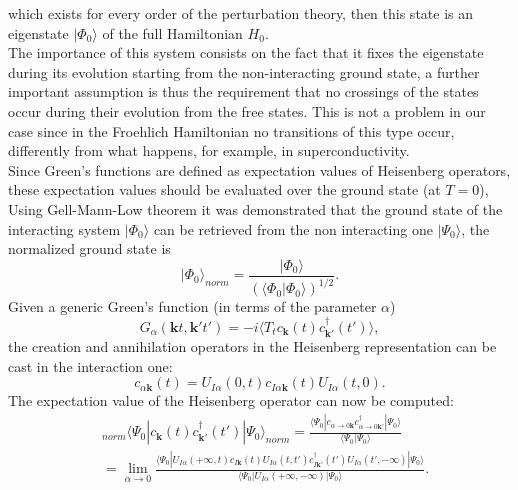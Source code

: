\documentclass[12pt, a4paper]{report}
\numberwithin{equation}{section}
\begin{document}
which exists for every order of the perturbation theory, then this state is an eigenstate $|\Phi_0\rangle$ of the full Hamiltonian $H_0$.\\
The importance of this system consists on the fact that it fixes the eigenstate during its evolution starting from the non-interacting ground 
state, a further important assumption is thus the requirement that no crossings of the states occur during their evolution from the free states. This is not 
a problem in our case since in the Froehlich Hamiltonian no transitions of this type occur, differently from what happens, for example, 
in superconductivity.\\
Since Green's functions are defined as expectation values of Heisenberg operators, these expectation values should be evaluated over the ground state (at $T=0$), 
Using Gell-Mann-Low theorem it was demonstrated that the ground state of the interacting system $|\Phi_0\rangle$ can be retrieved from the non interacting one $|\Psi_0\rangle$, 
the normalized ground state is
\begin{equation}
    |\Phi_0\rangle_{norm}=\frac{|\Phi_0\rangle}{\left(\langle \Phi_0|\Phi_0\rangle\right)^{1/2}}.
\end{equation}
Given a generic Green's function (in terms of the parameter $\alpha$)
\begin{equation}
    G_\alpha(\mathbf{k}t,\mathbf{k}'t')=-i\langle T_t c_{\mathbf{k}}(t)c^\dagger_{\mathbf{k}'}(t')\rangle,
\end{equation}
the creation and annihilation operators in the Heisenberg representation can be cast in the interaction one:
\begin{equation}
    c_{\alpha\mathbf{k}}(t)=U_{I\alpha}(0,t)c_{I\alpha\mathbf{k}}(t)U_{I\alpha}(t,0).
\end{equation}
The expectation value of the Heisenberg operator can now be computed:
\begin{equation}
\begin{split}
    &_{norm}\langle \Psi_0|c_{\mathbf{k}}(t)c^\dagger_{\mathbf{k}'}(t')|\Psi_0\rangle_{norm}=\frac{\langle\Psi_0|c_{\alpha\to0\mathbf{k}}c^\dagger_{\alpha\to0\mathbf{k}'}|\Psi_0\rangle}{\langle\Psi_0|\Psi_0\rangle}\\
    &=\lim_{\alpha\to0}\frac{\langle\Psi_0|U_{I\alpha}(+\infty,t)c_{I\mathbf{k}}(t)U_{I\alpha}(t,t')c^\dagger_{I\mathbf{k}'}(t')U_{I\alpha}(t',-\infty)|\Psi_0\rangle}{\langle\Psi_0|U_{I\alpha}(+\infty,-\infty)|\Psi_0\rangle}.
\end{split}
\end{equation}
\end{document}
